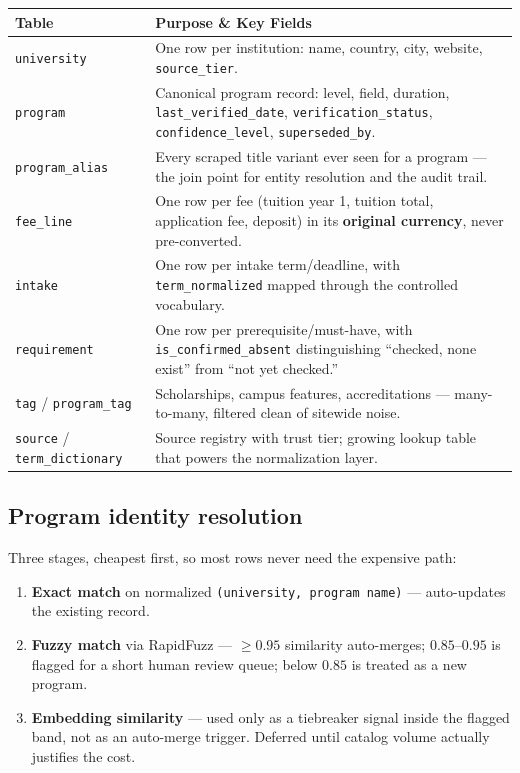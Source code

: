 \documentclass[11pt,a4paper]{article}
\begin{document}
\begin{center}
\small
\begin{tabular}{@{}L{2.6cm}L{9.9cm}@{}}
\toprule
\textbf{Table} & \textbf{Purpose \& Key Fields} \\
\midrule
\texttt{university} & One row per institution: name, country, city, website, \texttt{source\_tier}. \\
\texttt{program} & Canonical program record: level, field, duration, \texttt{last\_verified\_date}, \texttt{verification\_status}, \texttt{confidence\_level}, \texttt{superseded\_by}. \\
\texttt{program\_alias} & Every scraped title variant ever seen for a program --- the join point for entity resolution and the audit trail. \\
\texttt{fee\_line} & One row per fee (tuition year 1, tuition total, application fee, deposit) in its \textbf{original currency}, never pre-converted. \\
\texttt{intake} & One row per intake term/deadline, with \texttt{term\_normalized} mapped through the controlled vocabulary. \\
\texttt{requirement} & One row per prerequisite/must-have, with \texttt{is\_confirmed\_absent} distinguishing ``checked, none exist'' from ``not yet checked.'' \\
\texttt{tag} / \texttt{program\_tag} & Scholarships, campus features, accreditations --- many-to-many, filtered clean of sitewide noise. \\
\texttt{source} / \texttt{term\_dictionary} & Source registry with trust tier; growing lookup table that powers the normalization layer. \\
\bottomrule
\end{tabular}
\end{center}

\subsection{Program identity resolution}
Three stages, cheapest first, so most rows never need the expensive path:
\begin{enumerate}[leftmargin=1.6em, itemsep=2pt]
  \item \textbf{Exact match} on normalized \texttt{(university, program name)} --- auto-updates the existing record.
  \item \textbf{Fuzzy match} via RapidFuzz --- $\geq 0.95$ similarity auto-merges; $0.85$--$0.95$ is flagged for a short human review queue; below $0.85$ is treated as a new program.
  \item \textbf{Embedding similarity} --- used only as a tiebreaker signal inside the flagged band, not as an auto-merge trigger. Deferred until catalog volume actually justifies the cost.
\end{enumerate}
\end{document}
